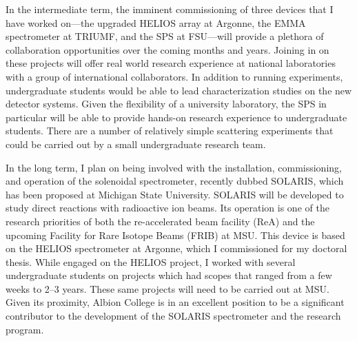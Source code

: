 {In the intermediate term, the imminent commissioning of three devices that I have worked on---the upgraded HELIOS array at Argonne, the EMMA spectrometer at TRIUMF, and the SPS at FSU---will provide a plethora of collaboration opportunities over the coming months and years.
Joining in on these projects will offer real world research experience at national laboratories with a group of international collaborators.
In addition to running experiments, undergraduate students would be able to lead characterization studies on the new detector systems.
Given the flexibility of a university laboratory, the SPS in particular will be able to provide hands-on research experience to undergraduate students. There are a number of relatively simple scattering experiments that could be carried out by a small undergraduate research team.

In the long term, I plan on being involved with the installation, commissioning, and operation of the solenoidal spectrometer, recently dubbed 
SOLARIS, which has been proposed at Michigan State University. SOLARIS will be developed to study direct reactions with radioactive ion beams. Its operation is one of the research priorities 
of both the re-accelerated beam facility (ReA) and the upcoming Facility for Rare Isotope Beams (FRIB) at MSU. 
This device is based on the HELIOS spectrometer at Argonne, which I commissioned for my doctoral thesis. While engaged on the HELIOS project, I worked with several undergraduate students on projects which had scopes that ranged from a few weeks to 2--3 years. These same projects will need to be carried out at MSU. 
Given its proximity, Albion College is in an excellent position to be a significant contributor to the development of the SOLARIS spectrometer and the research program. 
}
